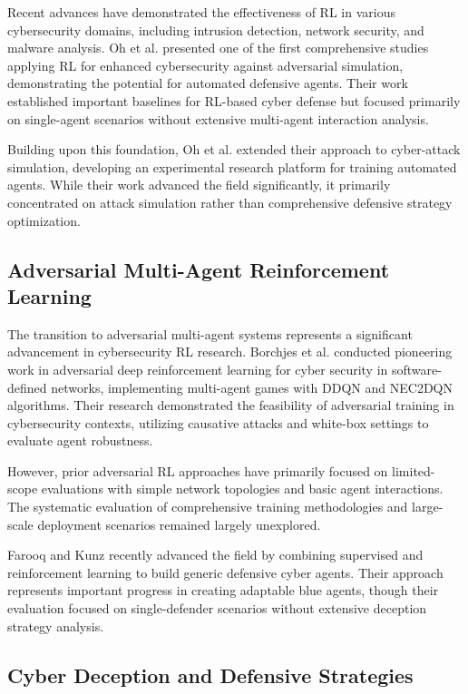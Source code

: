 \documentclass[12pt,twoside]{article}
\theoremstyle{definition}
\theoremstyle{plain}
\begin{document}
Recent advances have demonstrated the effectiveness of RL in various cybersecurity domains, including intrusion detection, network security, and malware analysis. Oh et al. \cite{oh2023applying} presented one of the first comprehensive studies applying RL for enhanced cybersecurity against adversarial simulation, demonstrating the potential for automated defensive agents. Their work established important baselines for RL-based cyber defense but focused primarily on single-agent scenarios without extensive multi-agent interaction analysis.

Building upon this foundation, Oh et al. \cite{oh2024employing} extended their approach to cyber-attack simulation, developing an experimental research platform for training automated agents. While their work advanced the field significantly, it primarily concentrated on attack simulation rather than comprehensive defensive strategy optimization.

\subsection{Adversarial Multi-Agent Reinforcement Learning}

The transition to adversarial multi-agent systems represents a significant advancement in cybersecurity RL research. Borchjes et al. \cite{borchjes2023adversarial} conducted pioneering work in adversarial deep reinforcement learning for cyber security in software-defined networks, implementing multi-agent games with DDQN and NEC2DQN algorithms. Their research demonstrated the feasibility of adversarial training in cybersecurity contexts, utilizing causative attacks and white-box settings to evaluate agent robustness.

However, prior adversarial RL approaches have primarily focused on limited-scope evaluations with simple network topologies and basic agent interactions. The systematic evaluation of comprehensive training methodologies and large-scale deployment scenarios remained largely unexplored.

Farooq and Kunz \cite{farooq2025combining} recently advanced the field by combining supervised and reinforcement learning to build generic defensive cyber agents. Their approach represents important progress in creating adaptable blue agents, though their evaluation focused on single-defender scenarios without extensive deception strategy analysis.

\subsection{Cyber Deception and Defensive Strategies}
\end{document}
